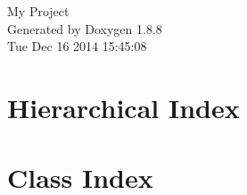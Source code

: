 \documentclass[twoside]{book}
\newcommand{\+}{\discretionary{\mbox{\scriptsize$\hookleftarrow$}}{}{}}
\newcommand{\clearemptydoublepage}{%
  \newpage{\pagestyle{empty}\cleardoublepage}%
}
\begin{document}
\hypersetup{pageanchor=false,
             bookmarks=true,
             bookmarksnumbered=true,
             pdfencoding=unicode
            }
\begin{titlepage}
\vspace*{7cm}
\begin{center}%
{\Large My Project }\\
\vspace*{1cm}
{\large Generated by Doxygen 1.8.8}\\
\vspace*{0.5cm}
{\small Tue Dec 16 2014 15:45:08}\\
\end{center}
\end{titlepage}
\clearemptydoublepage
\tableofcontents
\clearemptydoublepage
{}
\hypersetup{pageanchor=true}

\chapter{Hierarchical Index}

\chapter{Class Index}

\end{document}
